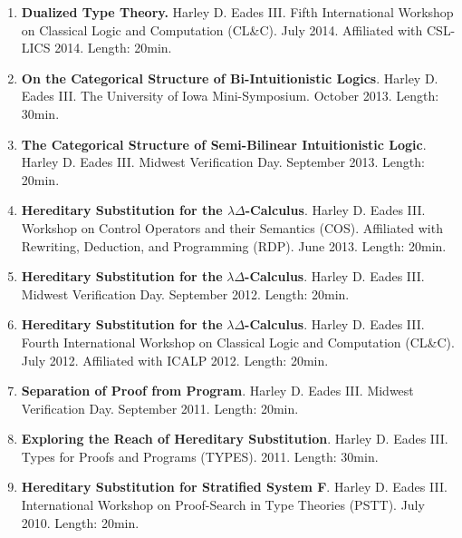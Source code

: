 \documentclass{article}
\begin{document}
  \begin{enumerate}        
    \item \textbf{Dualized Type Theory.} Harley D. Eades III.
      Fifth International Workshop on Classical Logic and Computation (CL\&C). July 2014. Affiliated with
      CSL-LICS 2014. Length: 20min.
      
    \item \textbf{On the Categorical Structure of Bi-Intuitionistic Logics}. Harley D. Eades III.
      The University of Iowa Mini-Symposium. October 2013. Length: 30min.
      
    \item \textbf{The Categorical Structure of Semi-Bilinear Intuitionistic Logic}. Harley D. Eades III.
      Midwest Verification Day. September 2013. Length: 20min.
      
    \item \textbf{Hereditary Substitution for the $\lambda\Delta$-Calculus}. Harley D. Eades III. 
      Workshop on Control Operators and their Semantics (COS). 
      Affiliated with Rewriting, Deduction, and Programming (RDP). June 2013. Length: 20min.
      
    \item \textbf{Hereditary Substitution for the }$\lambda\Delta$\textbf{-Calculus}. Harley D. Eades III.
      Midwest Verification Day. September 2012. Length: 20min.
      
    \item \textbf{Hereditary Substitution for the }$\lambda\Delta$\textbf{-Calculus}. Harley D. Eades III.
      Fourth International Workshop on Classical Logic and Computation (CL\&C). July 2012. Affiliated with ICALP 2012.
      Length: 20min.
      
    \item \textbf{Separation of Proof from Program}.
      Harley D. Eades III. Midwest Verification Day. September 2011. Length: 20min.

    \item \textbf{Exploring the Reach of Hereditary Substitution}. Harley D. Eades III.
      Types for Proofs and Programs (TYPES). 2011. Length: 30min.
      
    \item \textbf{Hereditary Substitution for Stratified System F}. Harley D. Eades III. 
      International Workshop on Proof-Search in Type Theories (PSTT). July 2010. Length: 20min.
    \end{enumerate}
\end{document}
